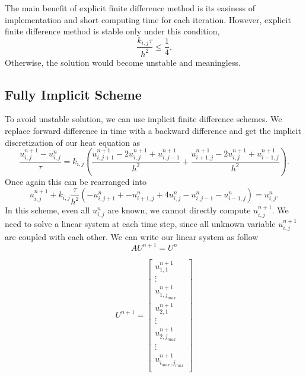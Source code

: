 \documentclass[10pt,a4paper]{report}
\begin{document}
The main benefit of explicit finite difference method is its easiness of implementation and short computing time for each iteration. However, explicit finite difference method is stable only under this condition,
\begin{equation}
{\frac{k_{i,j}\tau}{h^2}}\leq {\frac{1}{4}}.
\end{equation}
Otherwise, the solution would become unstable and meaningless.\\


\subsection{Fully Implicit Scheme}

To avoid unstable solution, we can use implicit finite difference schemes. We replace forward difference in time with a backward difference and get the implicit discretization of our heat equation as
\begin{equation}
{\frac{u^{n+1}_{i,j}-u^n_{i,j}}{\tau}}=k_{i,j}({\frac{u^{n+1}_{i,j+1}-2u^{n+1}_{i,j}+u^{n+1}_{i,j-1}}{h^2}}+{\frac{u^{n+1}_{i+1,j}-2u^{n+1}_{i,j}+u^{n+1}_{i-1,j}}{h^2}}).
\end{equation}
Once again this can be rearranged into
\begin{equation}
u^{n+1}_{i,j}+k_{i,j}{\frac{\tau}{h^2}}(-u^n_{i,j+1}+-u^n_{i+1,j}+4u^n_{i,j}-u^n_{i,j-1}-u^n_{i-1,j})=u^{n}_{i,j}.
\end{equation}
In this scheme, even all $u^n_{i,j}$ are known, we cannot directly compute $u^{n+1}_{i,j} $. We need to solve a linear system at each time step, since all unknown variable $u^{n+1}_{i,j}$ are coupled with each other. We can write our linear system as follow \[\] 
\begin{equation}
AU^{n+1}=U^{n}
\end{equation}

\begin{equation}
U^{n+1}=\begin{bmatrix}
u^{n+1}_{1,1}\\
\vdots\\
u^{n+1}_{1,j_{max}}\\
u^{n+1}_{2,1}\\
\vdots\\
u^{n+1}_{2,j_{max}}\\
\vdots\\
u^{n+1}_{i_{max},j_{max}}\\
\end{bmatrix}
\end{equation}
\[
\]
\end{document}
